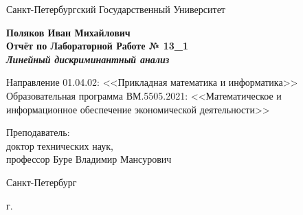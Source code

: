 \begin{titlepage}
	\begin{center}		
		Санкт-Петербургский Государственный Университет

		\vspace{35mm}
		
		\textbf{\large Поляков Иван Михайлович} \\[8mm]
		
		\textbf{\large Отчёт по Лабораторной Работе № 13\_1}\\[3mm]
		\textbf{\textit{\large Линейный дискриминантный анализ}}
		
		\vspace{20mm}
		
		Направление 01.04.02: <<Прикладная математика и информатика>>\\ 
		Образовательная программа ВМ.5505.2021: <<Математическое и информационное обеспечение экономической деятельности>> \\ [30mm]
		
		
		\begin{flushright}
			{Преподаватель:} \\
			доктор технических наук, \\ профессор Буре Владимир Мансурович
		\end{flushright}
		
		\vfill
		
		{Санкт-Петербург}
		\par{\the\year{} г.}
	\end{center}
\end{titlepage}
\restoregeometry
\addtocounter{page}{1}
